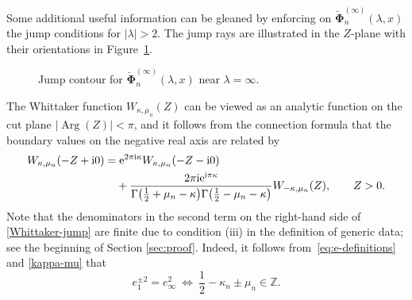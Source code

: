 \documentclass[11pt]{article}
\numberwithin{equation}{section}
\numberwithin{equation}{section}
\newcommand{\ee}{\mathrm{e}}
\newcommand{\ii}{\mathrm{i}}
\newcommand{\para}[1]{\breve{#1}}
\newcommand{\R}{{\mathbb{R}}}
\newcommand{\Z}{{\mathbb{Z}}}
\newcommand{\im}{\operatorname{Im}}
\renewcommand{\arg}{\operatorname{Arg}}
\begin{document}
Some additional useful information can be gleaned by enforcing on
$\para{\boldsymbol{\Phi}}_n^{(\infty)}(\lambda,x)$ the jump conditions for $|\lambda|>2$. The jump rays are illustrated in the $Z$-plane with their orientations in Figure~\ref{fig1}.
\begin{figure}
 \centering
 \caption{Jump contour for $\para{\boldsymbol{\Phi}}_n^{(\infty)}(\lambda,x)$ near $\lambda=\infty$.}
\label{fig1}
\end{figure}
The Whittaker function $W_{\kappa,\mu_n}(Z)$ can be viewed as an analytic function on the cut plane $|{\arg}(Z)|<\pi$, and it follows from the connection formula \cite[equation~(13.14.13)]{DLMF} that the boundary values on the negative real axis are related by
\begin{align}
&W_{\kappa,\mu_n}(-Z+\ii 0)= \ee^{2\pi \ii\kappa}W_{\kappa,\mu_n}(-Z-\ii 0)\nonumber \\
&\hphantom{W_{\kappa,\mu_n}(-Z+\ii 0)=}{} +
 \frac{2\pi \ii\ee^{\ii\pi\kappa}}{\Gamma\big(\frac{1}{2}+\mu_n-\kappa\big)\Gamma\big(\frac{1}{2}-\mu_n-\kappa\big)}W_{-\kappa,\mu_n}(Z),\qquad Z>0.
\label{Whittaker-jump}
\end{align}
Note that the denominators in the second term on the right-hand side of \eqref{Whittaker-jump} are finite due to condition (iii) in the definition of generic data; see the beginning of Section \ref{sec:proof}. Indeed, it follows from~\eqref{eq:e-definitions} and \eqref{kappa-mu} that
\[
e_1^{\pm 2} = e_\infty^2 \ \Leftrightarrow \ \frac{1}{2} - \kappa_n \pm \mu_n \in \Z.
\]
\end{document}
